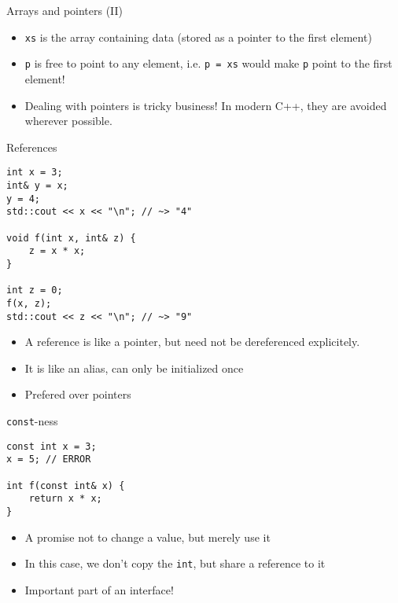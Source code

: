\documentclass[10pt]{beamer}
\begin{document}
\begin{frame}[fragile,label={sec:orgb83d1ef}]{Arrays and pointers (II)}

\begin{itemize}
\item \texttt{xs} is the array containing data (stored as a pointer to the first element)
\item \texttt{p} is free to point to any element, i.e. \texttt{p = xs} would make \texttt{p} point to the
first element!
\item Dealing with pointers is tricky business! In modern C++, they are avoided
wherever possible.
\end{itemize}
\end{frame}

\begin{frame}[fragile,label={sec:org8905c32}]{References}
 \begin{verbatim}
int x = 3;
int& y = x;
y = 4;
std::cout << x << "\n"; // ~> "4"

void f(int x, int& z) {
    z = x * x;
}

int z = 0;
f(x, z);
std::cout << z << "\n"; // ~> "9"
\end{verbatim}

\begin{itemize}
\item A reference is like a pointer, but need not be dereferenced explicitely.
\item It is like an alias, can only be initialized once
\item Prefered over pointers
\end{itemize}
\end{frame}

\begin{frame}[fragile,label={sec:org10baf73}]{\texttt{const}-ness}
 \begin{verbatim}
const int x = 3;
x = 5; // ERROR

int f(const int& x) {
    return x * x;
}
\end{verbatim}

\begin{itemize}
\item A promise not to change a value, but merely use it
\item In this case, we don't copy the \texttt{int}, but share a reference to it
\item Important part of an interface!
\end{itemize}
\end{frame}
\end{document}
